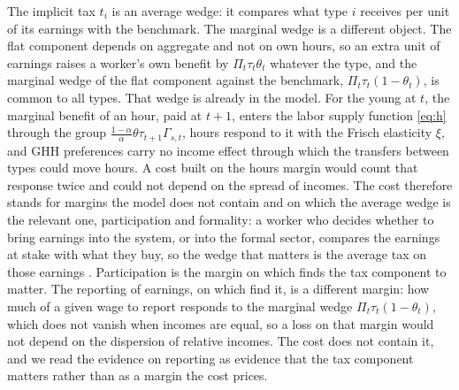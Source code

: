  The implicit tax $t_i$ is an average wedge: it compares what type $i$ receives per unit of its earnings with the benchmark. The marginal wedge is a different object. The flat component depends on aggregate and not on own hours, so an extra unit of earnings raises a worker's own benefit by $\Pi_t\tau_t\theta_t$ whatever the type, and the marginal wedge of the flat component against the benchmark, $\Pi_t\tau_t(1-\theta_t)$, is common to all types. That wedge is already in the model. For the young at $t$, the marginal benefit of an hour, paid at $t+1$, enters the labor supply function \eqref{eq:h} through the group $\frac{1-\alpha}{\alpha}\theta\tau_{t+1}\Gamma_{s,t}$, hours respond to it with the Frisch elasticity $\xi$, and GHH preferences carry no income effect through which the transfers between types could move hours. A cost built on the hours margin would count that response twice and could not depend on the spread of incomes. The cost therefore stands for margins the model does not contain and on which the average wedge is the relevant one, participation and formality: a worker who decides whether to bring earnings into the system, or into the formal sector, compares the earnings at stake with what they buy, so the wedge that matters is the average tax on those earnings \parencite{Saez02a1,KlevenK06a1}. Participation is the margin on which \textcite{Disney04a1} finds the tax component to matter. The reporting of earnings, on which \textcite{KumlerVF20a1} find it, is a different margin: how much of a given wage to report responds to the marginal wedge $\Pi_t\tau_t(1-\theta_t)$, which does not vanish when incomes are equal, so a loss on that margin would not depend on the dispersion of relative incomes. The cost does not contain it, and we read the evidence on reporting as evidence that the tax component matters rather than as a margin the cost prices.

